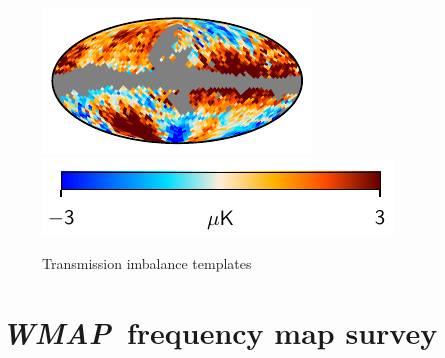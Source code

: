 \documentclass[twocolumn]{../../common/aa}
\def\WMAP{\emph{WMAP}}
\begin{document}
\begin{figure}[t]
        \includegraphics[width=0.16\linewidth]{figures/res_loss_W4_U.pdf}\\
        \includegraphics[width=0.30\linewidth]{figures/colourbar_3uK.pdf}\\         
	\caption{Transmission imbalance templates}
	\label{fig:imbal}
\end{figure}


\section{\WMAP\ frequency map survey}
\end{document}
